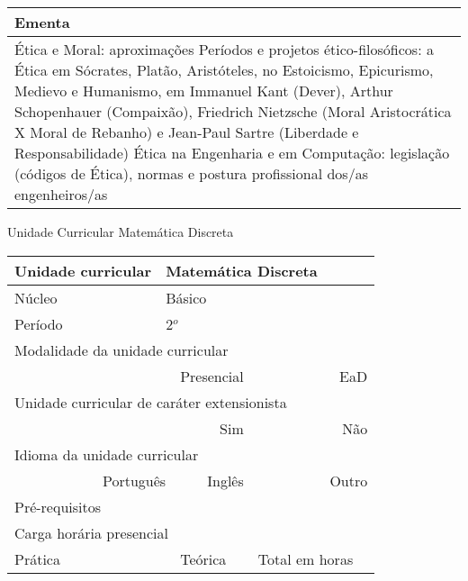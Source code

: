 \begin{quadro}[ht!]
\begin{tabular}{|p{3cm} p{2cm} p{3cm} p{2cm} p{3cm} p{2cm}|}
\multicolumn{6}{|p{15cm}|}{\cellcolor{blue1} Ementa} \\\hline
\hline\multicolumn{6}{|p{15cm}|}{\scriptsize Ética e Moral: aproximações Períodos e projetos ético-filosóficos: a Ética em Sócrates, Platão, Aristóteles, no Estoicismo, Epicurismo, Medievo e Humanismo, em Immanuel Kant (Dever), Arthur Schopenhauer (Compaixão), Friedrich Nietzsche (Moral Aristocrática X Moral de Rebanho) e Jean-Paul Sartre (Liberdade e Responsabilidade) Ética na Engenharia e em Computação: legislação (códigos de Ética), normas e postura profissional dos/as engenheiros/as}\\\hline 
\hline
	\end{tabular}
\end{quadro}


\begin{quadro}[ht!]
  \centering\scriptsize
\caption{Unidade Curricular Matemática Discreta}
\label{unit_11}
\begin{tabular}{|p{3cm} p{2cm} p{3cm} p{2cm} p{3cm} p{2cm}|}\hline
\multicolumn{1}{|p{3cm}|}{\cellcolor{blue1} Unidade curricular} & \multicolumn{5}{p{9cm}|}{Matemática Discreta}\\\hline
\multicolumn{1}{|p{3cm}|}{\cellcolor{blue1} Núcleo} & \multicolumn{5}{p{11.5cm}|}{Básico}\\\hline
\multicolumn{1}{|p{3cm}|}{\cellcolor{blue1} Período} & \multicolumn{5}{p{9cm}|}{2$^o$}\\\hline
\multicolumn{6}{|p{15cm}|}{\cellcolor{blue1} Modalidade da unidade curricular} \\\hline
\multicolumn{2}{|r}{		} &  \multicolumn{2}{r}{Presencial \XBox} & \multicolumn{2}{r|}{EaD \Square	} \\\hline
\multicolumn{6}{|p{15cm}|}{\cellcolor{blue1} Unidade curricular de caráter extensionista} \\\hline
\multicolumn{4}{|r}{			Sim \Square	} & \multicolumn{2}{r|}{	Não \XBox	}\\\hline
\multicolumn{6}{|p{15cm}|}{\cellcolor{blue1} Idioma da unidade curricular} \\ \hline
\multicolumn{2}{|r}{	Português \XBox	} &  \multicolumn{2}{r}{	Inglês \Square	} & \multicolumn{2}{r|}{	Outro \Square	} \\ \hline
\multicolumn{1}{|p{3cm}|}{\cellcolor{blue1} Pré-requisitos} & \multicolumn{5}{p{9cm}|}{}\\ \hline
\multicolumn{6}{|p{15cm}|}{\cellcolor{blue1} Carga horária presencial} \\ \hline
\multicolumn{1}{|p{3cm}|}{\raggedleft Prática} & \multicolumn{1}{p{1cm}|}{\centering	30	} &  \multicolumn{1}{p{3cm}|}{\raggedleft Teórica}  & \multicolumn{1}{p{1cm}|}{\centering 	30	} & \multicolumn{1}{p{3cm}|}{\raggedleft Total em horas} & \multicolumn{1}{p{1cm}|}{\raggedleft	60	} \\ \hline 

\end{tabular}
\end{quadro}
